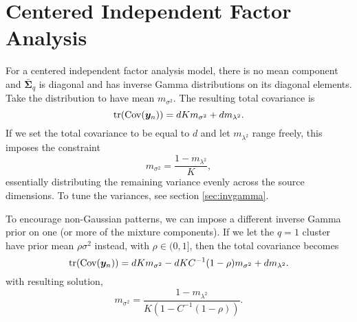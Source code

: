 \documentclass{article}
\newcommand{\obs}{y}
\newcommand{\obsvec}{\bm{\obs}}
\newcommand{\scale}{\sigma}
\newcommand{\scalesq}{\scale^2}
\newcommand{\compcov}{\bar{\bm{\Sigma}}}
\newcommand{\noisescalesq}{\lambda^2}
\begin{document}
\section{Centered Independent Factor Analysis}
For a centered independent factor analysis model, there is no mean component and $\compcov_q$ is diagonal and has inverse Gamma distributions on its diagonal elements. Take the distribution to have mean ${m}_{\scalesq}$. The resulting total covariance is
\begin{equation}
\trace(\Cov{\obsvec_n})=dKm_{\scalesq}+dm_{\noisescalesq}.
\end{equation}
If we set the total covariance to be equal to $d$ and let $m_{\noisescalesq}$ range freely, this imposes the constraint
\begin{equation}
m_{\scalesq}=\frac{1-m_{\noisescalesq}}{K},
\end{equation}
essentially distributing the remaining variance evenly across the source dimensions. To tune the variances, see section \ref{sec:invgamma}.

To encourage non-Gaussian patterns, we can impose a different inverse Gamma prior on one (or more of the mixture components). If we let the $q=1$ cluster have prior mean $\rho\scalesq$ instead, with $\rho\in(0,1]$, then the total covariance becomes
\begin{equation}
\trace(\Cov{\obsvec_n})=dKm_{\scalesq}-dKC^{-1}(1-\rho)m_{\scalesq}+dm_{\noisescalesq}.
\end{equation}
with resulting solution,
\begin{equation}
m_{\scalesq}=\frac{1-m_{\noisescalesq}}{K(1-C^{-1}(1-\rho))}.
\end{equation}
\end{document}
